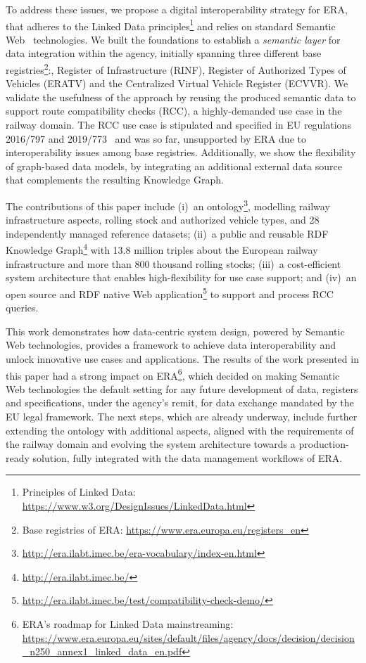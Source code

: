 To address these issues,
we propose a digital interoperability strategy for ERA,
that adheres to the Linked Data principles\footnote{Principles of Linked Data: \url{https://www.w3.org/DesignIssues/LinkedData.html}} \cite{heath2011}
and relies on standard Semantic Web~\cite{bernerslee2001} technologies.
We built the foundations to establish a \textit{semantic layer} for data integration within the agency,
initially spanning three different base registries\footnote{Base registries of ERA: \url{https://www.era.europa.eu/registers_en}}:,
Register of Infrastructure (RINF),
Register of Authorized Types of Vehicles (ERATV)
and the Centralized Virtual Vehicle Register (ECVVR).
We validate the usefulness of the approach
by reusing the produced semantic data to support route compatibility checks (RCC),
a highly-demanded use case in the railway domain.
The RCC use case is stipulated and specified in EU regulations 2016/797 and 2019/773~\cite{eu-797-2016, eu-773-2019}
and was so far, unsupported by ERA
due to interoperability issues among base registries.
Additionally, we show the flexibility of graph-based data models,
by integrating an additional external data source
that complements the resulting Knowledge Graph.

The contributions of this paper include
(i)~an ontology\footnote{\url{http://era.ilabt.imec.be/era-vocabulary/index-en.html}}, modelling railway infrastructure aspects, rolling stock and authorized vehicle types, and 28 independently managed reference datasets;
(ii)~a public and reusable RDF Knowledge Graph\footnote{\url{http://era.ilabt.imec.be/}} with 13.8 million triples about the European railway infrastructure and more than 800 thousand rolling stocks;
(iii)~a cost-efficient system architecture that enables high-flexibility for use case support; and
(iv)~an open source and RDF native Web application\footnote{\url{http://era.ilabt.imec.be/test/compatibility-check-demo/}} to support and process RCC queries.

This work demonstrates how data-centric system design,
powered by Semantic Web technologies,
provides a framework to achieve data interoperability
and unlock innovative use cases and applications.
The results of the work presented in this paper
had a strong impact on ERA\footnote{ERA's roadmap for Linked Data mainstreaming: \url{https://www.era.europa.eu/sites/default/files/agency/docs/decision/decision_n250_annex1_linked_data_en.pdf}},
which decided on making Semantic Web technologies
the default setting for any future development of data,
registers and specifications, under the agency's remit,
for data exchange mandated by the EU legal framework.
The next steps, which are already underway,
include further extending the ontology
with additional aspects,
aligned with the requirements of the railway domain
and evolving the system architecture
towards a production-ready solution,
fully integrated with the data management workflows of ERA.

